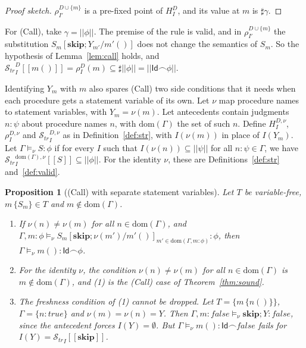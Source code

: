 \documentclass[11pt]{article}
\newcommand{\sem}[1]{[\![ #1 ]\!]}
\newcommand{\fsem}[1]{|\!|#1|\!|}
\newcommand{\Str}{{\mathcal{S}_{\mathit{tr}}}}
\newcommand{\chop}{\smallfrown}
\newcommand{\Id}{\mathsf{Id}}
\newcommand{\dup}{\sharp}
\newcommand{\dom}{\mathrm{dom}}
\newcommand{\kw}[1]{\mathbf{#1}}
\newcommand{\skipS}{\kw{skip}}
\newcommand{\call}[1]{#1()}
\theoremstyle{plain}
\newtheorem{proposition}[theorem]{Proposition}
\theoremstyle{definition}
\theoremstyle{remark}
\begin{document}
\begin{proof}[Proof sketch]
  $\rho^{D \cup \{m\}}_{I'}$ is a pre-fixed point of $H^D_I$, and its value
  at $m$ is $\dup\gamma$.
\end{proof}

For (Call), take $\gamma = \fsem{\phi}$. The premise of the rule is valid,
and in $\rho^{D \cup \{m\}}_{I'}$ the substitution $S_m[\skipS;Y_{m'}/m'()]$
does not change the semantics of $S_m$. So the hypothesis of
Lemma~\ref{lem:call} holds, and $\Str^D_I\sem{\call{m}} = \rho^D_I(m)
\subseteq \dup\fsem{\phi} = \fsem{\Id\chop\phi}$.

Identifying $Y_m$ with $m$ also spares (Call) two side conditions that it
needs when each procedure gets a statement variable of its own. Let $\nu$
map procedure names to statement variables, with $Y_m = \nu(m)$. Let
antecedents contain judgments $n : \psi$ about procedure names $n$, with
$\dom(\Gamma)$ the set of such $n$. Define $H^{D,\nu}_I$, $\rho^{D,\nu}_I$
and $\Str^{D,\nu}_I$ as in Definition~\ref{def:str}, with $I(\nu(m))$ in
place of $I(Y_m)$. Let $\Gamma \models_\nu S : \phi$ if for every $I$ such
that $I(\nu(n)) \subseteq \fsem{\psi}$ for all $n : \psi \in \Gamma$, we
have $\Str^{\dom(\Gamma),\nu}_I\sem{S} \subseteq \fsem{\phi}$. For the
identity $\nu$, these are Definitions~\ref{def:str} and~\ref{def:valid}.

\begin{proposition}[(Call) with separate statement variables]
  \label{prop:call-nu}
  Let $T$ be variable-free, $m\,\{S_m\} \in T$ and $m \notin \dom(\Gamma)$.
  \begin{enumerate}
  \item If $\nu(n) \neq \nu(m)$ for all $n \in \dom(\Gamma)$, and
    $\Gamma, m : \phi \models_\nu S_m[\skipS;\nu(m')/\call{m'}]_{m' \in
      \dom(\Gamma, m : \phi)} : \phi$, then $\Gamma \models_\nu \call{m} :
    \Id\chop\phi$.
  \item For the identity $\nu$, the condition $\nu(n) \neq \nu(m)$ for
    all $n \in \dom(\Gamma)$ is $m \notin \dom(\Gamma)$, and (1) is the
    (Call) case of Theorem~\ref{thm:sound}.
  \item The freshness condition of (1) cannot be dropped. Let
    $T = \{m\,\{\call{n}\}\}$, $\Gamma = \{n : \mathit{true}\}$ and
    $\nu(m) = \nu(n) = Y$. Then $\Gamma, m : \mathit{false} \models_\nu
    \skipS; Y : \mathit{false}$, since the antecedent forces $I(Y) =
    \emptyset$. But $\Gamma \models_\nu \call{m} :
    \Id\chop\mathit{false}$ fails for $I(Y) = \Str_I\sem{\skipS}$.
  \end{enumerate}
\end{proposition}
\end{document}
